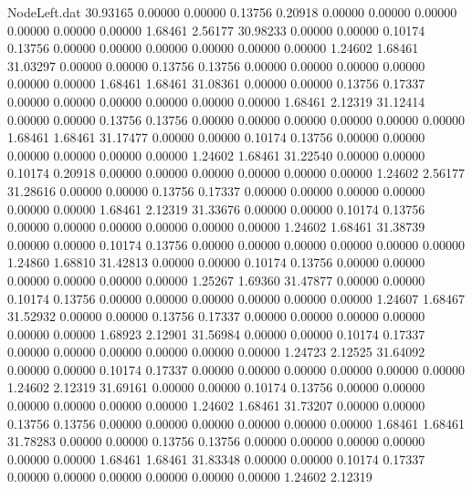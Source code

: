 \begin{filecontents}{NodeLeft.dat}
  30.93165    0.00000    0.00000     0.13756    0.20918    0.00000    0.00000    0.00000    0.00000    0.00000    0.00000    1.68461    2.56177
  30.98233    0.00000    0.00000     0.10174    0.13756    0.00000    0.00000    0.00000    0.00000    0.00000    0.00000    1.24602    1.68461
  31.03297    0.00000    0.00000     0.13756    0.13756    0.00000    0.00000    0.00000    0.00000    0.00000    0.00000    1.68461    1.68461
  31.08361    0.00000    0.00000     0.13756    0.17337    0.00000    0.00000    0.00000    0.00000    0.00000    0.00000    1.68461    2.12319
  31.12414    0.00000    0.00000     0.13756    0.13756    0.00000    0.00000    0.00000    0.00000    0.00000    0.00000    1.68461    1.68461
  31.17477    0.00000    0.00000     0.10174    0.13756    0.00000    0.00000    0.00000    0.00000    0.00000    0.00000    1.24602    1.68461
  31.22540    0.00000    0.00000     0.10174    0.20918    0.00000    0.00000    0.00000    0.00000    0.00000    0.00000    1.24602    2.56177
  31.28616    0.00000    0.00000     0.13756    0.17337    0.00000    0.00000    0.00000    0.00000    0.00000    0.00000    1.68461    2.12319
  31.33676    0.00000    0.00000     0.10174    0.13756    0.00000    0.00000    0.00000    0.00000    0.00000    0.00000    1.24602    1.68461
  31.38739    0.00000    0.00000     0.10174    0.13756    0.00000    0.00000    0.00000    0.00000    0.00000    0.00000    1.24860    1.68810
  31.42813    0.00000    0.00000     0.10174    0.13756    0.00000    0.00000    0.00000    0.00000    0.00000    0.00000    1.25267    1.69360
  31.47877    0.00000    0.00000     0.10174    0.13756    0.00000    0.00000    0.00000    0.00000    0.00000    0.00000    1.24607    1.68467
  31.52932    0.00000    0.00000     0.13756    0.17337    0.00000    0.00000    0.00000    0.00000    0.00000    0.00000    1.68923    2.12901
  31.56984    0.00000    0.00000     0.10174    0.17337    0.00000    0.00000    0.00000    0.00000    0.00000    0.00000    1.24723    2.12525
  31.64092    0.00000    0.00000     0.10174    0.17337    0.00000    0.00000    0.00000    0.00000    0.00000    0.00000    1.24602    2.12319
  31.69161    0.00000    0.00000     0.10174    0.13756    0.00000    0.00000    0.00000    0.00000    0.00000    0.00000    1.24602    1.68461
  31.73207    0.00000    0.00000     0.13756    0.13756    0.00000    0.00000    0.00000    0.00000    0.00000    0.00000    1.68461    1.68461
  31.78283    0.00000    0.00000     0.13756    0.13756    0.00000    0.00000    0.00000    0.00000    0.00000    0.00000    1.68461    1.68461
  31.83348    0.00000    0.00000     0.10174    0.17337    0.00000    0.00000    0.00000    0.00000    0.00000    0.00000    1.24602    2.12319

\end{filecontents}
